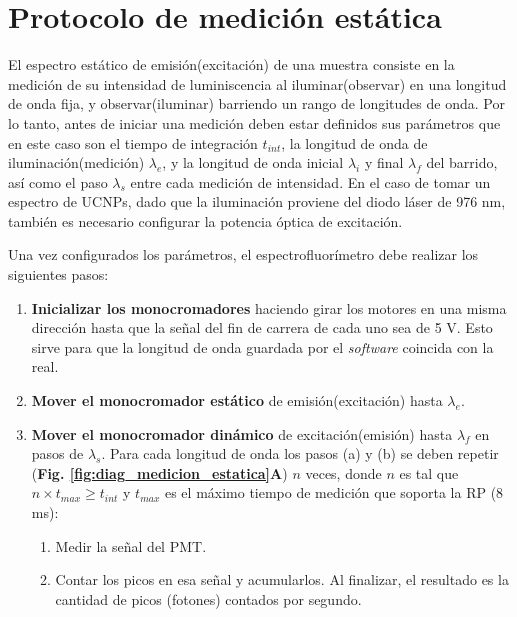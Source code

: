
\section{Protocolo de medición estática}

El espectro estático de emisión(excitación) de una muestra consiste en la medición de su intensidad de luminiscencia al iluminar(observar) en una longitud de onda fija, y observar(iluminar) barriendo un rango de longitudes de onda.
Por lo tanto, antes de iniciar una medición deben estar definidos sus parámetros que en este caso son el tiempo de integración $t_{int}$, la longitud de onda de iluminación(medición) $\lambda_e$, y la longitud de onda inicial $\lambda_i$ y final $\lambda_f$ del barrido, así como el paso $\lambda_s$ entre cada medición de intensidad.
En el caso de tomar un espectro de UCNPs, dado que la iluminación proviene del diodo láser de 976 nm, también es necesario configurar la potencia óptica de excitación.

Una vez configurados los parámetros, el espectrofluorímetro debe realizar los siguientes pasos:

\begin{enumerate}
     \item \textbf{Inicializar los monocromadores} haciendo girar los motores en una misma dirección hasta que la señal del fin de carrera de cada uno sea de 5 V. Esto sirve para que la longitud de onda guardada por el \textit{software} coincida con la real.
     \item \textbf{Mover el monocromador estático} de emisión(excitación) hasta $\lambda_e$. 
     \item \textbf{Mover el monocromador dinámico} de excitación(emisión) hasta $\lambda_f$ en pasos de $\lambda_s$. Para cada longitud de onda los pasos (a) y (b) se deben repetir (\textbf{Fig. \ref{fig:diag_medicion_estatica}A}) $n$ veces, donde $n$ es tal que $n \times t_{max} \geq t_{int}$ y $t_{max}$ es el máximo tiempo de medición que soporta la RP (8 ms):
     \begin{enumerate}
          \item Medir la señal del PMT.
          \item Contar los picos en esa señal y acumularlos. Al finalizar, el resultado es la cantidad de picos (fotones) contados por segundo.
     \end{enumerate}
\end{enumerate}


